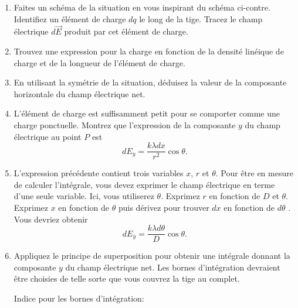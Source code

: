 \documentclass{tufte-handout}
\begin{document}
\begin{enumerate}
  \item Faites un schéma de la situation en vous inspirant du schéma ci-contre.
    Identifiez un élément de charge $dq$ le long de la tige. Tracez le champ
    électrique $d\vec{E}$ produit par cet élément de charge.
  \item Trouvez une expression pour la charge en fonction de la densité
    linéique de charge et de la longueur de l'élément de charge.
  \item En utilisant la symétrie de la situation, déduisez la valeur de la
    composante horizontale du champ électrique net.
  \item L'élément de charge est suffisamment petit pour se comporter comme une
    charge ponctuelle. Montrez que l'expression de la composante $y$ du champ
    électrique au point $P$ est
    \[
      dE_y = \frac{k \lambda dx}{r^2} \cos \theta.
    \]
  \item L'expression précédente contient trois variables $x$, $r$ et $\theta$.
    Pour être en mesure de calculer l'intégrale, vous devez exprimer le champ
    électrique en terme d'une seule variable. Ici, vous utiliserez $\theta$.
    Exprimez $r$ en fonction de $D$ et $\theta$. Exprimez $x$ en fonction de
    $\theta$ puis dérivez pour trouver $dx$ en fonction de $d\theta$
    .
    Vous devriez obtenir
    \[
      dE_y = \frac{k \lambda d\theta}{D} \cos \theta.
    \]
  \item Appliquez le principe de superposition pour obtenir une intégrale
    donnant la composante $y$ du champ électrique net. Les bornes d'intégration
    devraient être choisies de telle sorte que vous couvrez la tige au complet.

  \begin{marginfigure}
    Indice pour les bornes d'intégration:

  \end{marginfigure}


\end{enumerate}
\end{document}
